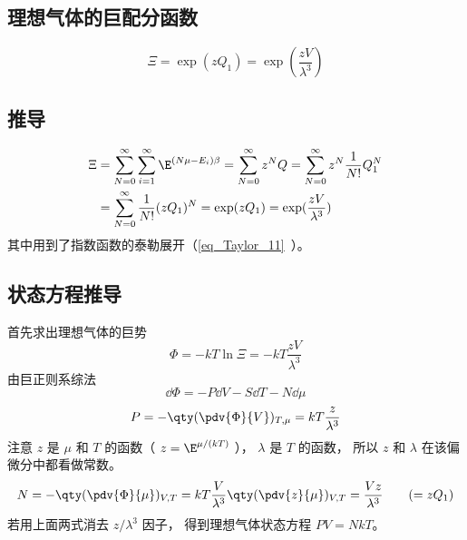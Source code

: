 
\begin{issues}
\issueDraft
\end{issues}

\subsection{理想气体的巨配分函数}
\begin{equation}\label{eq_IdMCE_1}
\Xi  = \exp(z Q_1) = \exp(\frac{zV}{\lambda^3})
\end{equation}
\subsection{推导}
\begin{equation}\label{eq_IdMCE_2}
\begin{aligned}
\Xi & = \sum_{N = 0}^\infty  \sum_{i = 1}^\infty  \E^{(N\mu - E_i)\beta}  = \sum_{N = 0}^\infty  z^N Q
 = \sum_{N = 0}^\infty  z^N \frac{1}{N!}Q_1^N \\
& = \sum_{N=0}^\infty  \frac{1}{N!} (z Q_1)^N
= \exp(z Q_1) = \exp(\frac{zV}{\lambda^3})
\end{aligned}
\end{equation}
其中用到了指数函数的泰勒展开（\autoref{eq_Taylor_11}~）。

\subsection{状态方程推导}
首先求出理想气体的巨势
\begin{equation}\label{eq_IdMCE_4}
\Phi  =  - kT\ln \Xi  =  - kT\frac{zV}{\lambda ^3}
\end{equation}
由巨正则系综法
\begin{equation}\label{eq_IdMCE_5}
\dd{\Phi} =  - P\dd{V} - S\dd{T} - N\dd{\mu}
\end{equation}
\begin{equation}\label{eq_IdMCE_6}
P = - \qty(\pdv{\Phi}{V})_{T, \mu} = kT\frac{z}{\lambda ^3}
\end{equation}
注意 $z$ 是 $\mu $ 和 $T$ 的函数（ $z = \E^{\mu/(kT)}$ ）， $\lambda $ 是 $T$ 的函数， 所以 $z$ 和 $\lambda $ 在该偏微分中都看做常数。
\begin{equation}\label{eq_IdMCE_7}
N = - \qty(\pdv{\Phi}{\mu})_{V,T} = kT\frac{V}{\lambda^3} \qty(\pdv{z}{\mu})_{V,T} = \frac{Vz}{\lambda ^3} 
\qquad ( = z{Q_1})
\end{equation}
若用上面两式消去 $z/\lambda^3$ 因子， 得到理想气体状态方程 $PV = NkT$。
  
